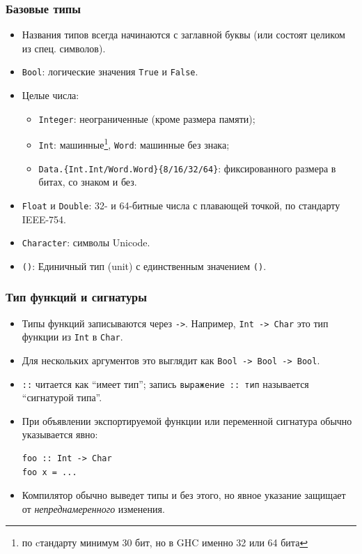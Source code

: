 \documentclass[10pt]{beamer}
\begin{document}
\begin{frame}[fragile]
\frametitle{Базовые типы}
\begin{itemize}
    \item Названия типов всегда начинаются с заглавной буквы (или состоят целиком из спец. символов).
    \item \lstinline|Bool|: логические значения \lstinline|True| и \lstinline|False|.
    \item Целые числа:
    \begin{itemize}
        \item \lstinline|Integer|: неограниченные (кроме размера памяти);
        \item \lstinline|Int|: машинные\footnote{по cтандарту минимум 30 бит, но в GHC именно 32 или 64 бита}, \lstinline|Word|: машинные без знака;
        \item \lstinline|Data.{Int.Int/Word.Word}{8/16/32/64}|: фиксированного размера в битах, со знаком и без.
    \end{itemize}
    \item \lstinline|Float| и \lstinline|Double|: 32- и 64-битные числа с плавающей точкой, по стандарту IEEE-754.
    \item \lstinline|Character|: символы Unicode.
    \item \lstinline|()|: Единичный тип (unit) с единственным значением \lstinline|()|.
\end{itemize}
\end{frame}

\begin{frame}[fragile]
\frametitle{Тип функций и сигнатуры}
\begin{itemize}
    \item Типы функций записываются через \lstinline|->|. Например, \lstinline|Int -> Char| это тип функции из \lstinline|Int| в \lstinline|Char|.
    
    \item Для нескольких аргументов это выглядит как \pause\lstinline|Bool -> Bool -> Bool|.
    
    \item \lstinline|::| читается как \enquote{имеет тип}; запись \lstinline|выражение :: тип| называется \enquote{сигнатурой типа}.
    
    \item При объявлении экспортируемой функции или переменной  сигнатура обычно указывается явно:
\begin{lstlisting}
foo :: Int -> Char
foo x = ...
\end{lstlisting}
    \item Компилятор обычно выведет типы и без этого, но явное указание защищает от \emph{непреднамеренного} изменения.
\end{itemize}
\end{frame}
\end{document}
